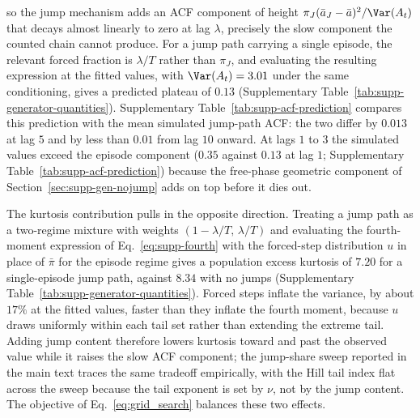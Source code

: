 so the jump mechanism adds an ACF component of height $\pi_J (\bar a_J
- \bar a)^2 / \Var(A_t)$ that decays almost linearly to zero at lag
$\lambda$, precisely the slow component the counted chain cannot
produce. For a jump path carrying a single episode, the relevant
forced fraction is $\lambda / T$ rather than $\pi_J$, and evaluating
the resulting expression at the fitted values, with $\Var(A_t) =
3.01$ under the same conditioning, gives a predicted plateau of
$0.13$ (Supplementary Table~\ref{tab:supp-generator-quantities}).
Supplementary Table~\ref{tab:supp-acf-prediction} compares
this prediction with the mean simulated jump-path ACF: the two differ
by $0.013$ at lag $5$ and by less than $0.01$ from lag $10$ onward. At lags $1$ to $3$ the
simulated values exceed the episode component ($0.35$ against $0.13$
at lag $1$; Supplementary Table~\ref{tab:supp-acf-prediction}) because the free-phase geometric component of
Section~\ref{sec:supp-gen-nojump} adds on top before it dies out.

\begin{table}[tbp]
\centering
\caption{\textbf{Episode-overlap prediction of the jump-path
    absolute-return autocorrelation function (ACF) against
    simulation.} The prediction evaluates
    Eq.~\eqref{eq:supp-acf-wj} at the fitted SPY values with the
    single-episode forced fraction $\lambda/T$ in place of $\pi_J$
    and the same-episode probability $h(\tau)$ of
    Eq.~\eqref{eq:supp-h}. The simulated column is the mean ACF of
    $|G_t|$ over the $99$ jump-active paths among $400$ simulated
    in-sample-length paths. The free-phase component of
    Eq.~\eqref{eq:supp-acf-nj} is excluded from the prediction; it
    has decayed below $0.01$ from lag $5$ onward.}
\label{tab:supp-acf-prediction}
\small

\end{table}

The kurtosis contribution pulls in the opposite direction. Treating a
jump path as a two-regime mixture with weights $(1 - \lambda/T,\,
\lambda/T)$ and evaluating the fourth-moment expression of
Eq.~\eqref{eq:supp-fourth} with the forced-step distribution $u$ in
place of $\bar\pi$ for the episode regime gives a population excess
kurtosis of $7.20$ for a single-episode jump path, against $8.34$
with no jumps (Supplementary Table~\ref{tab:supp-generator-quantities}). Forced steps inflate the variance, by about $17\%$ at
the fitted values, faster than they inflate the fourth moment,
because $u$ draws uniformly within each tail set
rather than extending the extreme tail. Adding jump content therefore
lowers kurtosis toward and past the observed value while it raises
the slow ACF component; the jump-share sweep reported in the main
text traces the same tradeoff empirically, with the Hill tail index
flat across the sweep because the tail exponent is set by $\nu$, not
by the jump content. The objective of
Eq.~\eqref{eq:grid_search} balances these two effects.

